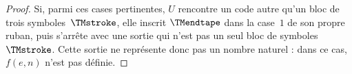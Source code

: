 \documentclass[../../../include/open-logic-section]{subfiles}
\begin{document}
\begin{proof}
Si, parmi ces cases pertinentes, $U$ rencontre un code autre
qu'un bloc de trois symboles~$\TMstroke$, elle inscrit $\TMendtape$ dans la case~$1$ de son propre ruban, puis s'arrête
avec une sortie qui n'est pas un seul bloc de
symboles~$\TMstroke$. Cette sortie ne représente donc pas un
nombre naturel : dans ce cas, $f(e,n)$ n'est pas définie.
\end{proof}
\end{document}
